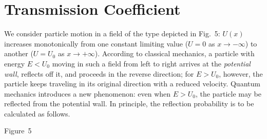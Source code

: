 \section{Transmission Coefficient}

We consider particle motion in a field of the type depicted in Fig.~5:
$U(x)$ increases monotonically from one constant limiting value ($U=0$ as
$x\to-\infty$) to another ($U=U_0$ as $x\to+\infty$). According to
classical mechanics, a particle with energy $E<U_0$ moving in such a field
from left to right arrives at the \emph{potential wall}, reflects off it,
and proceeds in the reverse
direction; for $E>U_0$, however, the particle keeps traveling in its original
direction with a reduced velocity. Quantum mechanics introduces a new
phenomenon: even when $E>U_0$, the particle may be reflected from the
potential wall. In principle, the reflection probability is to be calculated
as follows.

\begin{center}

\small Figure~5
\end{center}

